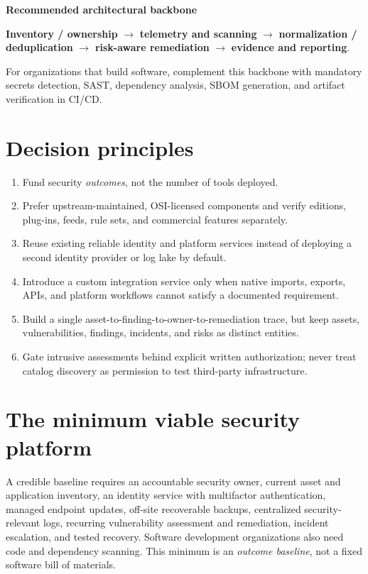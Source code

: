 \documentclass[11pt,oneside]{report}
\begin{document}
\begin{insight}
\textbf{Recommended architectural backbone}\par
\textbf{Inventory / ownership} $\rightarrow$ \textbf{telemetry and scanning} $\rightarrow$ \textbf{normalization / deduplication} $\rightarrow$ \textbf{risk-aware remediation} $\rightarrow$ \textbf{evidence and reporting}.\par
For organizations that build software, complement this backbone with mandatory secrets detection, SAST, dependency analysis, SBOM generation, and artifact verification in CI/CD.
\end{insight}

\section{Decision principles}
\begin{enumerate}[leftmargin=1.6em,itemsep=3pt]
\item Fund security \emph{outcomes}, not the number of tools deployed.
\item Prefer upstream-maintained, OSI-licensed components and verify editions, plug-ins, feeds, rule sets, and commercial features separately.
\item Reuse existing reliable identity and platform services instead of deploying a second identity provider or log lake by default.
\item Introduce a custom integration service only when native imports, exports, APIs, and platform workflows cannot satisfy a documented requirement.
\item Build a single asset-to-finding-to-owner-to-remediation trace, but keep assets, vulnerabilities, findings, incidents, and risks as distinct entities.
\item Gate intrusive assessments behind explicit written authorization; never treat catalog discovery as permission to test third-party infrastructure.
\end{enumerate}

\section{The minimum viable security platform}
A credible baseline requires an accountable security owner, current asset and application inventory, an identity service with multifactor authentication, managed endpoint updates, off-site recoverable backups, centralized security-relevant logs, recurring vulnerability assessment and remediation, incident escalation, and tested recovery. Software development organizations also need code and dependency scanning. This minimum is an \emph{outcome baseline}, not a fixed software bill of materials.
\end{document}
